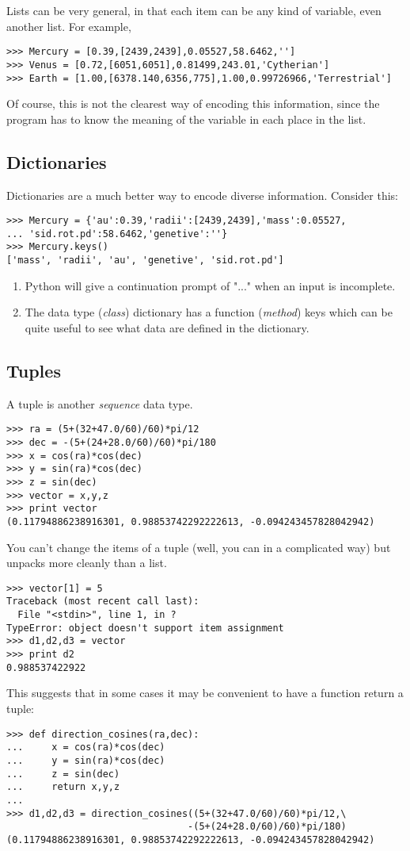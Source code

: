 \documentclass{article}
\begin{document}
Lists can be very general, in that each item can be any kind of variable,
even another list. For example,
{\small \begin{verbatim}
>>> Mercury = [0.39,[2439,2439],0.05527,58.6462,'']
>>> Venus = [0.72,[6051,6051],0.81499,243.01,'Cytherian']
>>> Earth = [1.00,[6378.140,6356,775],1.00,0.99726966,'Terrestrial']
\end{verbatim}}
Of course, this is not the clearest way of encoding this information, since the
program has to know the meaning of the variable in each place in the list.

\subsection{Dictionaries}

Dictionaries are a much better way to encode diverse information. Consider
this:
\begin{verbatim}
>>> Mercury = {'au':0.39,'radii':[2439,2439],'mass':0.05527, 
... 'sid.rot.pd':58.6462,'genetive':''}
>>> Mercury.keys()
['mass', 'radii', 'au', 'genetive', 'sid.rot.pd']
\end{verbatim}

\begin{enumerate}
\item Python will give a continuation prompt of "..." when an input is
incomplete.
\item The data type ({\itshape class}) {\ttfamily dictionary} has a
function ({\itshape method}) {\ttfamily keys}
which can be quite useful to see what data are defined in the dictionary.
\end{enumerate}

\subsection{Tuples}

A tuple is another {\itshape sequence} data type.
\begin{verbatim}
>>> ra = (5+(32+47.0/60)/60)*pi/12
>>> dec = -(5+(24+28.0/60)/60)*pi/180
>>> x = cos(ra)*cos(dec)
>>> y = sin(ra)*cos(dec)
>>> z = sin(dec)
>>> vector = x,y,z
>>> print vector
(0.11794886238916301, 0.98853742292222613, -0.094243457828042942)
\end{verbatim}
You can't change the items of a tuple (well, you can in a complicated way) but
unpacks more cleanly than a list.
\begin{verbatim}
>>> vector[1] = 5
Traceback (most recent call last):
  File "<stdin>", line 1, in ?
TypeError: object doesn't support item assignment
>>> d1,d2,d3 = vector
>>> print d2
0.988537422922
\end{verbatim} 
This suggests that in some cases it may be
convenient to have a function return a tuple:
\begin{verbatim}
>>> def direction_cosines(ra,dec):
...     x = cos(ra)*cos(dec)
...     y = sin(ra)*cos(dec)
...     z = sin(dec)
...     return x,y,z
...
>>> d1,d2,d3 = direction_cosines((5+(32+47.0/60)/60)*pi/12,\
                                -(5+(24+28.0/60)/60)*pi/180)
(0.11794886238916301, 0.98853742292222613, -0.094243457828042942)
\end{verbatim}
\end{document}
